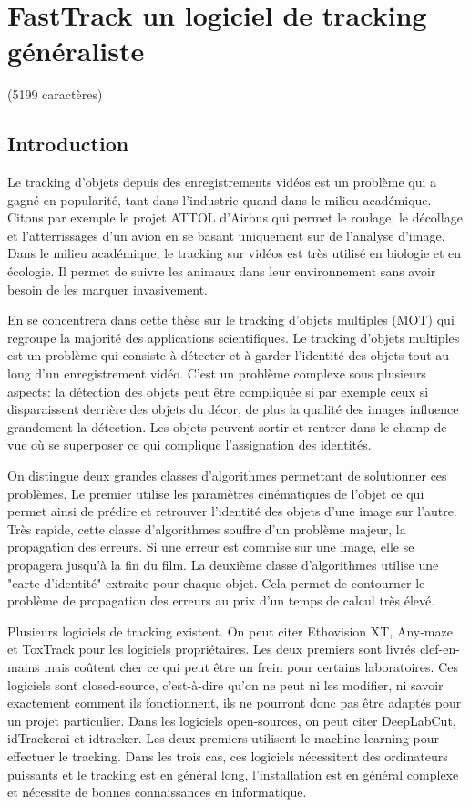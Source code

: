 \section*{FastTrack un logiciel de tracking généraliste}
(5199 caractères)
\subsection*{Introduction}
Le tracking d'objets depuis des enregistrements vidéos est un problème qui a gagné en popularité, tant dans l'industrie quand dans le milieu académique. Citons par exemple le projet ATTOL d'Airbus qui permet le roulage, le décollage et l'atterrissages d'un avion en se basant uniquement sur de l'analyse d'image. Dans le milieu académique, le tracking sur vidéos est très utilisé en biologie et en écologie. Il permet de suivre les animaux dans leur environnement sans avoir besoin de les marquer invasivement.

En se concentrera dans cette thèse sur le tracking d'objets multiples (MOT) qui regroupe la majorité des applications scientifiques. Le tracking d'objets multiples est un problème qui consiste à détecter et à garder l'identité des objets tout au long d'un enregistrement vidéo. C'est un problème complexe sous plusieurs aspects: la détection des objets peut être compliquée si par exemple ceux si disparaissent derrière des objets du décor, de plus la qualité des images influence grandement la détection. Les objets peuvent sortir et rentrer dans le champ de vue où se superposer ce qui complique l'assignation des identités.

On distingue deux grandes classes d'algorithmes permettant de solutionner ces problèmes. Le premier utilise les paramètres cinématiques de l'objet ce qui permet ainsi de prédire et retrouver l'identité des objets d'une image sur l'autre. Très rapide, cette classe d'algorithmes souffre d'un problème majeur, la propagation des erreurs. Si une erreur est commise sur une image, elle se propagera jusqu'à la fin du film. La deuxième classe d'algorithmes utilise une "carte d'identité" extraite pour chaque objet. Cela permet de contourner le problème de propagation des erreurs au prix d'un temps de calcul très élevé.

Plusieurs logiciels de tracking existent. On peut citer Ethovision XT, Any-maze et ToxTrack pour les logiciels propriétaires. Les deux premiers sont livrés clef-en-mains mais coûtent cher ce qui peut être un frein pour certains laboratoires. Ces logiciels sont closed-source, c’est-à-dire qu'on ne peut ni les modifier, ni savoir exactement comment ils fonctionnent, ils ne pourront donc pas être adaptés pour un projet particulier. Dans les logiciels open-sources, on peut citer DeepLabCut, idTrackerai et idtracker. Les deux premiers utilisent le machine learning pour effectuer le tracking. Dans les trois cas, ces logiciels nécessitent des ordinateurs puissants et le tracking est en général long, l'installation est en général complexe et nécessite de bonnes connaissances en informatique.

